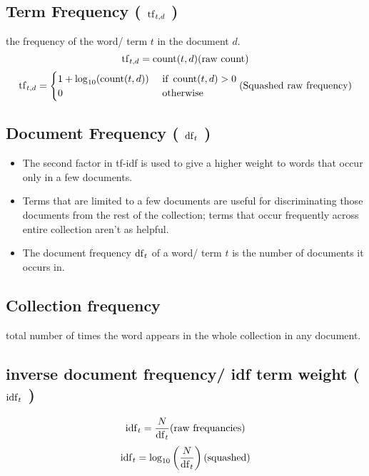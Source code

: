 \subsection{Term Frequency ( $\operatorname{tf}_{t,d}$ ) \cite{nlp-1}} \label{Term Frequency}

the frequency of the word/ term $t$ in the document $d$.
\[
    \rcmdXtf_{t,d} = \rcmdXcount(t,d) \hfill \text{(raw count)}
\]
\[
    \rcmdXtf_{t,d} = \begin{cases}
        1 + \log_{10}(\rcmdXcount(t,d)) & \text{ if } \rcmdXcount(t,d) > 0\\
        0 & \text{ otherwise}
    \end{cases} \hfill \text{(Squashed raw frequency)}
\]

\subsection{Document Frequency ( $\operatorname{df}_t$ ) \cite{nlp-1}}\label{Document Frequency}

\begin{itemize}
    \item The second factor in tf-idf is used to give a higher weight to words that occur only in a few documents.

    \item Terms that are limited to a few documents are useful for discriminating those documents from the rest of the collection; terms that occur frequently across entire collection aren't as helpful.

    \item The document frequency $\operatorname{df}_t$ of a word/ term $t$ is the number of documents it occurs in.

    
\end{itemize}

\subsection{Collection frequency \cite{nlp-1}}\label{Collection frequency}
total number of times the word appears in the whole collection in any document.

\subsection{inverse document frequency/ idf term weight ( $\operatorname{idf}_t$ )}\label{inverse document frequency/ idf term weight}
\[
    \rcmdXidf_t = \displaystyle\frac{N}{\rcmdXdf_t} \hfill \text{(raw frequancies)}
\]
\[
    \rcmdXidf_t = \log_{10} \left(\displaystyle\frac{N}{\rcmdXdf_t} \right) \hfill \text{(squashed)}
\]

